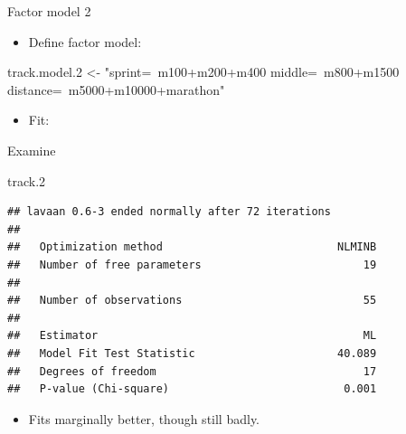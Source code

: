 \documentclass[ignorenonframetext,]{beamer}
\newenvironment{Shaded}{\begin{snugshade}}{\end{snugshade}}
\newcommand{\DataTypeTok}[1]{\textcolor[rgb]{0.13,0.29,0.53}{#1}}
\newcommand{\FloatTok}[1]{\textcolor[rgb]{0.00,0.00,0.81}{#1}}
\newcommand{\KeywordTok}[1]{\textcolor[rgb]{0.13,0.29,0.53}{\textbf{#1}}}
\newcommand{\NormalTok}[1]{#1}
\newcommand{\OperatorTok}[1]{\textcolor[rgb]{0.81,0.36,0.00}{\textbf{#1}}}
\newcommand{\StringTok}[1]{\textcolor[rgb]{0.31,0.60,0.02}{#1}}
\providecommand{\tightlist}{%
  \setlength{\itemsep}{0pt}\setlength{\parskip}{0pt}}
\begin{document}
\begin{frame}[fragile]{Factor model 2}
\protect\hypertarget{factor-model-2}{}

\begin{itemize}
\tightlist
\item
  Define factor model:
\end{itemize}

\begin{Shaded}
\begin{Highlighting}[]
\NormalTok{track.model}\FloatTok{.2}\NormalTok{ <-}\StringTok{ "sprint=~m100+m200+m400}
\StringTok{                  middle=~m800+m1500}
\StringTok{                  distance=~m5000+m10000+marathon"}
\end{Highlighting}
\end{Shaded}

\begin{itemize}
\tightlist
\item
  Fit:
\end{itemize}

\begin{Shaded}
\end{Shaded}

\end{frame}

\begin{frame}[fragile]{Examine}
\protect\hypertarget{examine}{}

\begin{Shaded}
\begin{Highlighting}[]
\NormalTok{track}\FloatTok{.2}
\end{Highlighting}
\end{Shaded}

\begin{verbatim}
## lavaan 0.6-3 ended normally after 72 iterations
## 
##   Optimization method                           NLMINB
##   Number of free parameters                         19
## 
##   Number of observations                            55
## 
##   Estimator                                         ML
##   Model Fit Test Statistic                      40.089
##   Degrees of freedom                                17
##   P-value (Chi-square)                           0.001
\end{verbatim}

\begin{itemize}
\tightlist
\item
  Fits marginally better, though still badly.
\end{itemize}

\end{frame}
\end{document}
